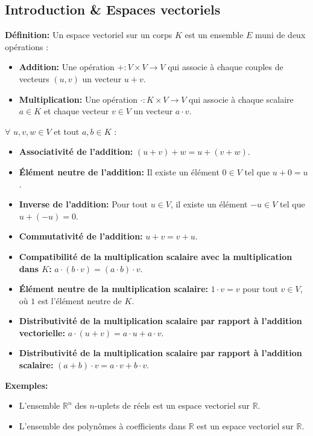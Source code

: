 \subsection{Introduction \& Espaces vectoriels}

\textbf{Définition:}
Un espace vectoriel sur un corps $K$ est un ensemble $E$ muni de deux opérations :
\begin{itemize}
    \item \textbf{Addition:} Une opération $+ : V \times V \to V$ qui associe à chaque couples de vecteurs $(u, v)$ un vecteur $u + v$.
    \item \textbf{Multiplication:} Une opération $\cdot : K \times V \to V$ qui associe à chaque scalaire $a \in K$ et chaque vecteur $v \in V$ un vecteur $a \cdot v$.
\end{itemize}
$\forall$ $u, v, w \in V$ et tout $a, b \in K$ :
\begin{itemize}
    \item \textbf{Associativité de l'addition:} $(u + v) + w = u + (v + w)$.
    \item \textbf{Élément neutre de l'addition:} Il existe un élément $0 \in V$ tel que $u + 0 = u$.
    \item \textbf{Inverse de l'addition:} Pour tout $u \in V$, il existe un élément $-u \in V$ tel que $u + (-u) = 0$.
    \item \textbf{Commutativité de l'addition:} $u + v = v + u$.
    \item \textbf{Compatibilité de la multiplication scalaire avec la multiplication dans $K$:} $a \cdot (b \cdot v) = (a \cdot b) \cdot v$.
    \item \textbf{Élément neutre de la multiplication scalaire:} $1 \cdot v = v$ pour tout $v \in V$, où $1$ est l'élément neutre de $K$.
    \item \textbf{Distributivité de la multiplication scalaire par rapport à l'addition vectorielle:} $a \cdot (u + v) = a \cdot u + a \cdot v$.
    \item \textbf{Distributivité de la multiplication scalaire par rapport à l'addition scalaire:} $(a + b) \cdot v = a \cdot v + b \cdot v$.
\end{itemize}

\textbf{Exemples:}
\begin{itemize}
    \item L'ensemble $\mathbb{R}^n$ des $n$-uplets de réels est un espace vectoriel sur $\mathbb{R}$.
    \item L'ensemble des polynômes à coefficients dans $\mathbb{R}$ est un espace vectoriel sur $\mathbb{R}$.
\end{itemize}

